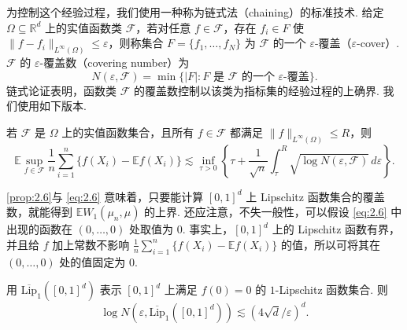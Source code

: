 为控制这个经验过程，我们使用一种称为链式法（chaining）的标准技术. 给定 $\Omega\subseteq\mathbb R^d$ 上的实值函数类 $\mathcal F$，若对任意 $f\in\mathcal F$，存在 $f_i\in F$ 使 $\lVert f-f_i\rVert_{L^\infty(\Omega)}\le\varepsilon$，则称集合 $F=\{f_1,\ldots,f_N\}$ 为 $\mathcal F$ 的一个 $\varepsilon$-覆盖（$\varepsilon$-cover）. $\mathcal F$ 的 $\varepsilon$-覆盖数（covering number）为
$$N(\varepsilon,\mathcal F)=\min\{|F|:F\text{ 是 }\mathcal F\text{ 的一个 }\varepsilon\text{-覆盖}\}.$$
链式论证表明，函数类 $\mathcal F$ 的覆盖数控制以该类为指标集的经验过程的上确界. 我们使用如下版本.
\begin{proposition}\label{prop:2.6}
若 $\mathcal F$ 是 $\Omega$ 上的实值函数集合，且所有 $f\in\mathcal F$ 都满足 $\lVert f\rVert_{L^\infty(\Omega)}\le R$，则
$$\mathbb E\sup_{f\in\mathcal F}\frac1n\sum_{i=1}^n\{f(X_i)-\mathbb Ef(X_i)\}
\lesssim\inf_{\tau>0}\left\{\tau+\frac1{\sqrt n}\int_\tau^R\sqrt{\log N(\varepsilon,\mathcal F)}\,d\varepsilon\right\}.$$
\end{proposition}
\autoref{prop:2.6}与 \eqref{eq:2.6} 意味着，只要能计算 $[0,1]^d$ 上 Lipschitz 函数集合的覆盖数，就能得到 $\mathbb EW_1(\mu_n,\mu)$ 的上界. 还应注意，不失一般性，可以假设 \eqref{eq:2.6} 中出现的函数在 $(0,\ldots,0)$ 处取值为 $0$. 事实上，$[0,1]^d$ 上的 Lipschitz 函数有界，并且给 $f$ 加上常数不影响 $\frac1n\sum_{i=1}^n\{f(X_i)-\mathbb Ef(X_i)\}$ 的值，所以可将其在 $(0,\ldots,0)$ 处的值固定为 $0$.
\begin{lemma}\label{lem:2.7}
用 $\overline{\mathrm{Lip}}_1([0,1]^d)$ 表示 $[0,1]^d$ 上满足 $f(0)=0$ 的 $1$-Lipschitz 函数集合. 则
$$\log N(\varepsilon,\overline{\mathrm{Lip}}_1([0,1]^d))\lesssim(4\sqrt d/\varepsilon)^d.$$
\end{lemma}
